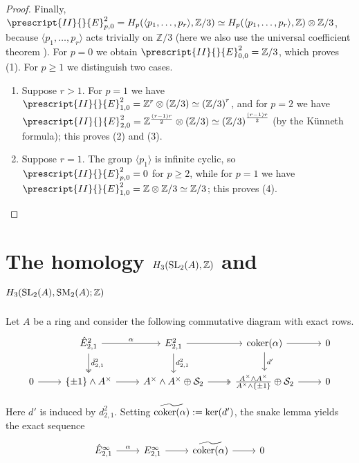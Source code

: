 \documentclass[11pt]{amsart}
\theoremstyle{definition}
\theoremstyle{plain}
\numberwithin{equation}{section}
\newcommand{\z}{\mathbb{Z}}
\renewcommand{\SS}{\mathcal{S}}
\renewcommand{\aa}{{A^\times}}
\newcommand{\lan}{\langle}
\newcommand{\ran}{\rangle}
\newcommand{\SL}{\mathit{{\rm SL}}}
\newcommand{\SM}{\mathit{{\rm SM}}}
\newcommand{\coker}{{\rm coker}}
\begin{document}
\begin{proof}
    Finally, $\prescript{II}{}{E}^2_{p,0}=H_p(\lan p_1,\dots,p_r\ran,\z/3)\simeq H_p(\lan p_1,\dots,p_r\ran,\z)\otimes \z/3$, because $\lan p_1,\dots,p_r\ran$ acts trivially on $\z/3$ (here we also use the universal coefficient theorem \cite[III.1, Exercise 3]{brown1994}). For $p=0$ we obtain $\prescript{II}{}{E}^2_{0,0}=\z/3$, which proves (1). For $p\geq 1$ we distinguish two cases.
    \begin{enumerate}
        \item Suppose $r>1$. For $p=1$ we have $\prescript{II}{}{E}^2_{1,0}=\z^r\otimes(\z/3)\simeq\left(\z/3\right)^r$, and for $p=2$ we have $\prescript{II}{}{E}^2_{2,0}=\z^{\frac{(r-1)r}{2}}\otimes(\z/3)\simeq\left(\z/3\right)^{\frac{(r-1)r}{2}}$ (by the K\"unneth formula); this proves (2) and (3).
        \item Suppose $r=1$. The group $\lan p_1\ran$ is infinite cyclic, so $\prescript{II}{}{E}^2_{p,0}=0$ for $p\geq 2$, while for $p=1$ we have $\prescript{II}{}{E}^2_{1,0}=\z\otimes\z/3\simeq\z/3$; this proves (4).
    \end{enumerate}
\end{proof}
\section{The homology \texorpdfstring{$H_3(\SL_2(A),\z)$ and $H_3(\SL_2(A),\SM_2(A);\z)$}{H3(SL2(A),z) and H3(SL2(A),SM2(A);z)}}
Let $A$ be a ring and consider the following commutative diagram with exact rows.
\begin{equation}
    \begin{tikzcd}
        & \hat{E}^2_{2,1}\ar[r,"\alpha"]\ar[d,twoheadrightarrow,"\hat{d}^2_{2,1}"] & E^2_{2,1}\ar[r]\ar[d,"d^2_{2,1}"] & \coker(\alpha) \ar[r] \ar[d,"d'"] & 0\\
        0 \ar[r] & \{\pm 1\}\wedge\aa\ar[r] & \aa\wedge\aa\oplus\SS_2 \ar[r,twoheadrightarrow] & \frac{\aa\wedge\aa}{\aa\wedge\{\pm 1\}}\oplus\SS_2 \ar[r]& 0 
    \end{tikzcd}
\end{equation}

Here $d'$ is induced by $d^2_{2,1}$. Setting $\widetilde{\coker(\alpha)}:=\ker(d')$, the snake lemma yields the exact sequence
\begin{equation}
    \label{alph-inf}
    \begin{tikzcd}
        \hat{E}^{\infty}_{2,1}\ar[r,"\alpha"] & E^{\infty}_{2,1}\ar[r] & \widetilde{\coker(\alpha)} \ar[r] & 0
    \end{tikzcd}
\end{equation}
\end{document}
